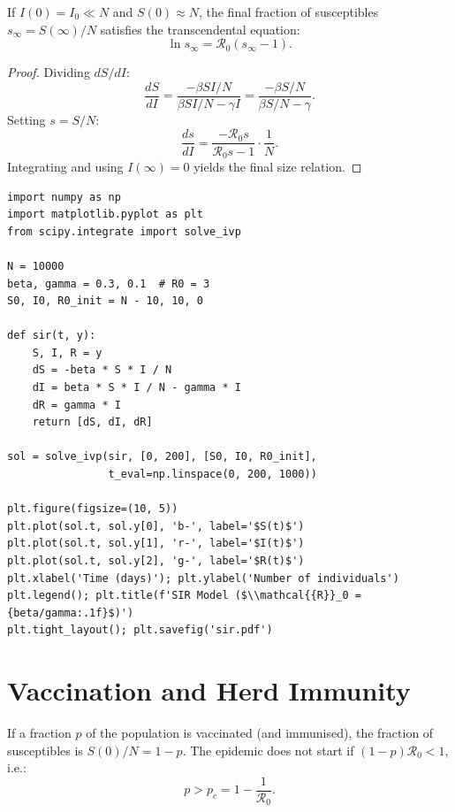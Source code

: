 \begin{theorem}
If $I(0)=I_0\ll N$ and $S(0)\approx N$, the final fraction of
susceptibles $s_\infty = S(\infty)/N$ satisfies the transcendental
equation:
\[
  \ln s_\infty = \mathcal{R}_0(s_\infty - 1).
\]
\end{theorem}

\begin{proof}
Dividing $dS/dI$:
\[
  \frac{dS}{dI} = \frac{-\beta SI/N}{\beta SI/N - \gamma I}
  = \frac{-\beta S/N}{\beta S/N - \gamma}.
\]
Setting $s = S/N$:
\[
  \frac{ds}{dI} = \frac{-\mathcal{R}_0 s}{\mathcal{R}_0 s - 1}\cdot\frac{1}{N}.
\]
Integrating and using $I(\infty)=0$ yields the final size relation.
\end{proof}

\begin{codeblock}[title=\textbf{SIR model simulation}]
\begin{verbatim}
import numpy as np
import matplotlib.pyplot as plt
from scipy.integrate import solve_ivp

N = 10000
beta, gamma = 0.3, 0.1  # R0 = 3
S0, I0, R0_init = N - 10, 10, 0

def sir(t, y):
    S, I, R = y
    dS = -beta * S * I / N
    dI = beta * S * I / N - gamma * I
    dR = gamma * I
    return [dS, dI, dR]

sol = solve_ivp(sir, [0, 200], [S0, I0, R0_init],
                t_eval=np.linspace(0, 200, 1000))

plt.figure(figsize=(10, 5))
plt.plot(sol.t, sol.y[0], 'b-', label='$S(t)$')
plt.plot(sol.t, sol.y[1], 'r-', label='$I(t)$')
plt.plot(sol.t, sol.y[2], 'g-', label='$R(t)$')
plt.xlabel('Time (days)'); plt.ylabel('Number of individuals')
plt.legend(); plt.title(f'SIR Model ($\\mathcal{{R}}_0 = {beta/gamma:.1f}$)')
plt.tight_layout(); plt.savefig('sir.pdf')
\end{verbatim}
\end{codeblock}

\section{Vaccination and Herd Immunity}
\label{sec:vaccination}

\begin{theorem}
If a fraction $p$ of the population is vaccinated (and immunised),
the fraction of susceptibles is $S(0)/N = 1-p$.  The epidemic does
not start if $(1-p)\mathcal{R}_0 < 1$, i.e.:
\[
  p > p_c = 1 - \frac{1}{\mathcal{R}_0}.
\]
\end{theorem}

